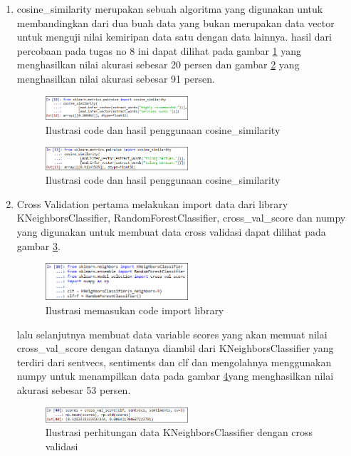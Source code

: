 \begin{enumerate}
\item cosine\_similarity
\subitem merupakan sebuah algoritma yang digunakan untuk membandingkan dari dua buah data yang bukan merupakan data vector untuk menguji nilai kemiripan data satu dengan data lainnya. hasil dari percobaan pada tugas no 8 ini dapat dilihat pada gambar \ref{fig34} yang menghasilkan nilai akurasi sebesar 20 persen dan gambar \ref{fig35} yang menghasilkan nilai akurasi sebesar 91 persen.
\begin{figure}[!htbp]
	\centering
	\includegraphics[width=0.5\textwidth]{figures/fathi/chapter5/hari4/1}
	\caption{Ilustrasi code dan hasil penggunaan cosine\_similarity}
	\label{fig34}
\end{figure}

\begin{figure}[!htbp]
	\centering
	\includegraphics[width=0.5\textwidth]{figures/fathi/chapter5/hari4/2}
	\caption{Ilustrasi code dan hasil penggunaan cosine\_similarity}
	\label{fig35}
\end{figure}

\item Cross Validation
\subitem pertama melakukan import data dari library KNeighborsClassifier, RandomForestClassifier, cross\_val\_score dan numpy yang digunakan untuk membuat data cross validasi dapat dilihat pada gambar \ref{fig36}.
\begin{figure}[!htbp]
	\centering
	\includegraphics[width=0.5\textwidth]{figures/fathi/chapter5/hari4/3}
	\caption{Ilustrasi memasukan code import library}
	\label{fig36}
\end{figure}

\subitem lalu selanjutnya membuat data variable scores yang akan memuat nilai cross\_val\_score dengan datanya diambil dari KNeighborsClassifier yang terdiri dari sentvecs, sentiments dan clf dan mengolahnya menggunakan numpy untuk menampilkan data pada gambar \ref{fig37}yang menghasilkan nilai akurasi sebesar 53 persen.
\begin{figure}[!htbp]
	\centering
	\includegraphics[width=0.5\textwidth]{figures/fathi/chapter5/hari4/4}
	\caption{Ilustrasi perhitungan data KNeighborsClassifier dengan cross validasi}
	\label{fig37}
\end{figure}


\end{enumerate}
